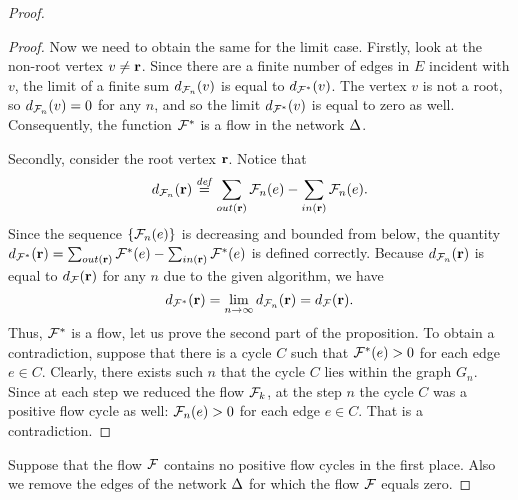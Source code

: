 \documentclass[12pt,oneside,a4paper]{amsart}
\begin{document}
\begin{proof}
\begin{proof}
          Now we need to obtain the same for the limit case.
          Firstly, look at the non-root vertex $v \neq \mathbf{r}$.
          Since there are a finite number of edges in $E$ incident with $v$, the limit of
            a finite sum $d_{\mathcal{F}_{n}}(v)$ is equal to $d_{\mathcal{F^{*}}}(v)$.
          The vertex $v$ is not a root, so $d_{\mathcal{F}_{n}}(v) = 0$ for any $n$, and so the limit $d_{\mathcal{F^{*}}}(v)$ is equal to zero as well.
          Consequently, the function $\mathcal{F^{*}}$ is a flow in the network $\Delta$.

          Secondly, consider the root vertex $\mathbf{r}$.
          Notice that
          \[
            d_{\mathcal{F}_{n}}(\mathbf{r}) \overset{\mathit{def}}{=} \sum_{out(\mathbf{r})} \mathcal{F}_{n}(e) - \sum_{in(\mathbf{r})} \mathcal{F}_{n}(e).
          \]
          Since the sequence $\{\mathcal{F}_{n}(e)\}$ is decreasing and bounded from below,
            the quantity $d_{\mathcal{F^{*}}}(\mathbf{r})=\sum_{out(\mathbf{r})} \mathcal{F^{*}}(e) - \sum_{in(\mathbf{r})} \mathcal{F^{*}}(e)$ is defined correctly.
          Because $d_{\mathcal{F}_{n}}(\mathbf{r})$ is equal to $d_{\mathcal{F}}(\mathbf{r})$ for any $n$ due to the given algorithm, we have
          \[
            d_{\mathcal{F^{*}}}(\mathbf{r}) = \lim_{n \to \infty} d_{\mathcal{F}_{n}}(\mathbf{r}) = d_{\mathcal{F}}(\mathbf{r}).
          \]
          Thus, $\mathcal{F^{*}}$ is a flow, let us prove the second part of the proposition.
          To obtain a contradiction, suppose that there is a cycle $C$ such that $\mathcal{F^{*}}(e) > 0$ for
            each edge $e \in C$.
          Clearly, there exists such $n$ that the cycle $C$ lies within the graph $G_n$.
          Since at each step we reduced the flow $\mathcal{F}_{k}$, at the step $n$
            the cycle $C$ was a positive flow cycle as well: $\mathcal{F}_{n}(e) > 0$ for each edge $e \in C$.
          That is a contradiction.
        \end{proof}

        Suppose that the flow $\mathcal{F}$ contains no positive flow cycles in the first place.
        Also we remove the edges of the network $\Delta$ for which the flow $\mathcal{F}$ equals zero.

      \medskip

\end{proof}
\end{document}
